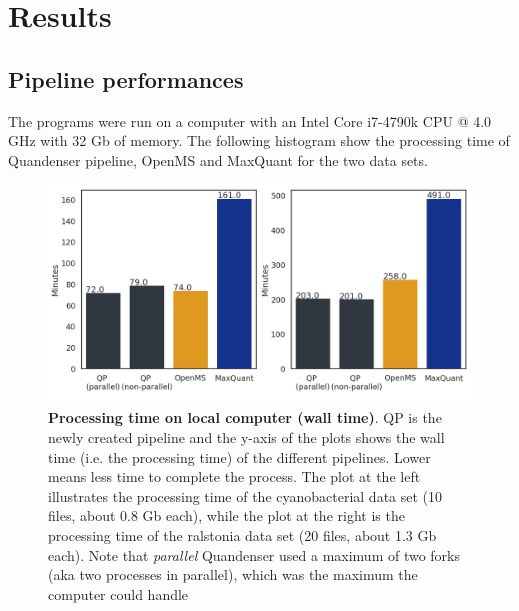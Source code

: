 \section{Results}

\subsection{Pipeline performances}

The programs were run on a computer with an Intel Core i7-4790k CPU @ 4.0 GHz with 32 Gb of memory. The following histogram show the processing time of Quandenser pipeline, OpenMS and MaxQuant for the two data sets.

\begin{figure}[H]
  \includegraphics[width=\linewidth]{results/times.png}
  \caption{\textbf{Processing time on local computer (wall time)}. QP is the newly created pipeline and the y-axis of the plots shows the wall time (i.e. the processing time) of the different pipelines. Lower means less time to complete the process. The plot at the left illustrates the processing time of the cyanobacterial data set (10 files, about 0.8 Gb each), while the plot at the right is the processing time of the ralstonia data set (20 files, about 1.3 Gb each). Note that \textit{parallel} Quandenser used a maximum of two forks (aka two processes in parallel), which was the maximum the computer could handle}
  \label{fig:processing-local}
\end{figure}

